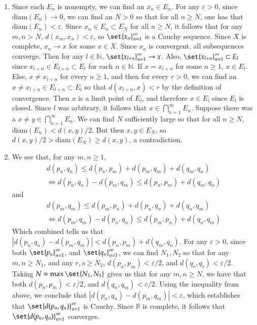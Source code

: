 \documentclass[12pt]{article}
\def\mbb#1{\mathbb{#1}}
\def\bN{\mbb{N}}
\def \R{\mbb{R}}
\def \ve{\varepsilon}
\theoremstyle{definition}
\theoremstyle{remark}
\begin{document}
\begin{enumerate}[leftmargin=\labelsep]
		\item Since each $E_n$ is nonempty, we can find an $x_n \in E_n$. For any $\ve > 0$, since $\mathrm{diam}(E_n) \to 0$, we can find an $N > 0$ so that for all $n \geq N$, one has that $\mathrm{diam}(E_n) < \ve$. Since $x_n \in E_n \subset E_N$ for all $n \geq N$, it follows that for any $m, n > N$, $d(x_m, x_n) < \ve$, so $\set{x_n}_{n=1}^\infty$ is a Cauchy sequence. Since $X$ is complete, $x_n \to x$ for some $x \in X$. Since $x_n$ is convergent, all subsequences converge. Then for any $l \in \bN$, $\set{x_{l+n}}_{n=1}^\infty \to x$. Also, $\set{x_{l+n}}_{n=1}^\infty \subset E_l$ since $x_{l+n} \in E_{l+n} \subset E_l$ for each $n \in \bN$. If $x = x_{l+n}$ for some $n \geq 1$, $x \in E_l$. Else, $x \neq x_{l+n}$ for every $n \geq 1$, and then for every $r > 0$, we can find an $x \neq x_{l+n} \in E_{l+n} \subset E_l$ so that $d(x_{l+n}, x) < r$ by the definition of convergence. Then $x$ is a limit point of $E_l$, and therefore $x \in E_l$ since $E_l$ is closed. Since $l$ was arbitrary, it follows that $x \in \bigcap_{n=1}^{\infty} E_n$. Suppose there was a $x \neq y \in \bigcap_{n=1}^{\infty} E_n$. We can find $N$ sufficiently large so that for all $n \geq N$, $\mathrm{diam}(E_n) < d(x, y) / 2$. But then $x, y \in E_N$, so $d(x,y)/2 > \mathrm{diam}(E_N) \geq d(x,y)$, a contradiction.
		
		\item We see that, for any $m, n \geq  1$,
		\begin{align*}
			d(p_n, q_n) \leq d(p_n, p_m) + d(p_m, q_m) + d(q_m, q_n) \\
			\iff d(p_n, q_n) - d(p_m, q_m) \leq d(p_n, p_m) + d(q_m, q_n)
		\end{align*}
		and 
		\begin{align*}
			d(p_m, q_m) \leq d(p_m, p_n) + d(p_n, q_n) + d(q_n, q_m) \\
			\iff d(p_m, q_m) - d(p_n, q_n) \leq d(p_m, p_n) + d(q_n, q_m)
		\end{align*}
		Which combined tells us that $|d(p_n, q_n) - d(p_m, q_m)| < d(p_n, p_m) + d(q_m, q_n)$. For any $\ve > 0$, since both $\set{p_n}_{n=1}^{\infty}$, and $\set{q_n}_{n=1}^{\infty}$, we can find $N_1, N_2$ so that for any $m, n \geq N_1$, and any $r, s \geq N_2$, $d(p_n, p_m) < \ve/2$, and $d(q_r, q_s) < \ve/2$. Taking $N = \max\set{N_1, N_1}$ gives us that for any $m,n \geq N$, we have that both $d(p_n, p_m) < \ve/2$, and $d(q_n, q_m) < \ve/2$. Using the inequality from above, we conclude that $|d(p_n, q_n) - d(p_m, q_m)| < \ve$, which establishes that $\set{d(p_n, q_n)}_{n=1}^\infty$ is Cauchy. Since $\R$ is complete, it follows that $\set{d(p_n, q_n)}_{n=1}^\infty$ converges.
		

\end{enumerate}
\end{document}
